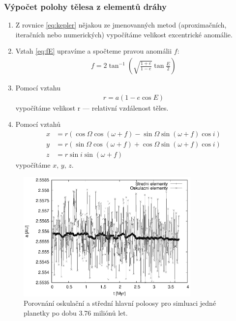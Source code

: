 \documentclass[A4paper, 12pt, oneside]{book}
\begin{document}
\subsubsection{Výpočet polohy tělesa z elementů dráhy}
\begin{enumerate}[label=\arabic*.]
	\item Z rovnice \eqref{eq:kepler} nějakou ze jmenovanných metod (aproximačních, iteračních nebo numerických) vypočítáme velikost excentrické anomálie.
	\item Vztah \eqref{eq:fE} upravíme a spočteme pravou anomálii $f$:
		\begin{align}
			f = 2\tan^{-1}(\sqrt{\frac{1+e}{1-e}}\tan \frac{E}{2})
		\end{align}
	\item Pomocí vztahu 
		\begin{align}
			r=a(1-e\cos E)
		\end{align}
		vypočítáme velikost r --- relativní vzdálenost těles.
	\item Pomocí vztahů
		\begin{align}
			x&=r(\cos\Omega\cos(\omega+f)-\sin\Omega\sin(\omega+f)\cos i) \\
			y&=r(\sin\Omega\cos(\omega+f)+\cos\Omega\sin(\omega+f)\cos i) \\
			z&=r\sin i\sin(\omega+f)
		\end{align}
		vypočítáme $x,\,y,\,z$.
\end{enumerate}

\begin{figure}
	\centering
	\includegraphics[width=0.8\textwidth]{obr/atOF}
	\caption{Porovnání oskulační a střední hlavní poloosy pro simluaci jedné planetky po dobu 3.76 miliónů let.}
	\label{atOF}
\end{figure}
\end{document}
